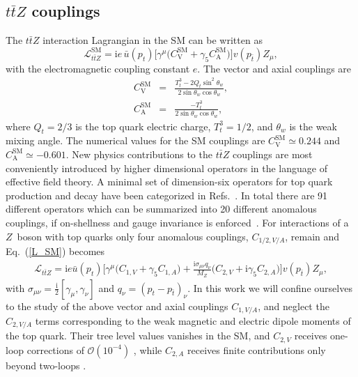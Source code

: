 \documentclass{JHEP3}
\newcommand{\mrm}{\mathrm}
\def\ttbZ{t\bar{t}Z}
\def\sw{\sin \theta_w}
\def\swsq{\sin^2 \theta_w}
\def\cw{\cos \theta_w}
\def\ConeVSM{C_\mathrm{V}^{\mrm{SM}}}
\def\ConeASM{C_\mathrm{A}^{\mrm{SM}}}
\newcommand{\be}{\begin{eqnarray}}
\newcommand{\ee}{\end{eqnarray}}
\begin{document}
\subsection{$\ttbZ$ couplings}   \label{sect:ttzcoupl}
The $\ttbZ$ interaction Lagrangian in the SM can be written as
\begin{equation} 
  \label{L_SM}
  \mathcal{L}_{\ttbZ}^{\mrm{SM}} = \mathrm{i} e \, \bar{u}(p_t)\biggl[ \gamma^{\mu} \bigl( \ConeVSM + \gamma_5 \ConeASM \bigr) \biggr]v(p_{\bar{t}}) Z_{\mu},
  \end{equation}
  with the electromagnetic coupling constant $e$. The vector and axial couplings are 
\be
  \ConeVSM &=& \frac{T^3_t - 2Q_t \swsq}{2\sw \cw}, \nonumber \\
  \ConeASM &=& \frac{-T^3_t}{2 \sw \cw},  
\ee
where $Q_t = 2/3$ is the top quark electric charge, $T^3_t=1/2$, and $\theta_w$ is the weak mixing angle. 
The numerical values for the SM couplings are $\ConeVSM \simeq 0.244$ and $\ConeASM \simeq -0.601$.
New physics contributions to the $\ttbZ$ couplings are most conveniently introduced by higher dimensional operators 
in the language of effective field theory. 
A minimal set of dimension-six operators for top quark production and decay have been categorized in Refs.~\cite{AlcarazMaestre:2012vp,AguilarSaavedra:2008zc,Zhang:2012cd}.
In total there are 91 different operators which can be summarized into 20 different anomalous couplings, if on-shellness and gauge invariance is enforced~\cite{AguilarSaavedra:2008zc}. 
For interactions of a $Z$~boson with top quarks only four anomalous couplings, $C_{1/2,V/A}$, remain and Eq.~(\ref{L_SM}) becomes
\be
  \label{L_NP}
  \mathcal{L}_{\ttbZ} = \mathrm{i} e \bar{u}(p_t)\biggl[ \gamma^{\mu} \bigl(C_{1,V} + \gamma_5 C_{1,A} \bigr)
  + \frac{\mathrm{i} \sigma_{\mu \nu} q_{\nu}}{M_Z} 
  \bigl(C_{2,V} + \mathrm{i} \gamma_5 C_{2,A} \bigr) \biggr] v(p_{\bar{t}}) Z_{\mu} ,
\ee
with $\sigma_{\mu \nu}=\frac{\mathrm{i}}{2} [ \gamma_{\mu},\gamma_{\nu} ]$ and $q_{\nu} = (p_{t}-p_{\bar{t}})_{\nu}$.
In this work we will confine ourselves to the study of the above vector and axial couplings $C_{1,V/A}$, and neglect the $C_{2,V/A}$ terms corresponding to the weak magnetic and electric dipole moments of the top quark. 
Their tree level values vanishes in the SM, and $C_{2,V}$ receives one-loop corrections of $ \mathcal{O}(10^{-4})$ \cite{Bernabeu:1995gs}, while $C_{2,A}$ receives finite contributions only beyond two-loops \cite{Hollik:1998vz}. 
\end{document}
